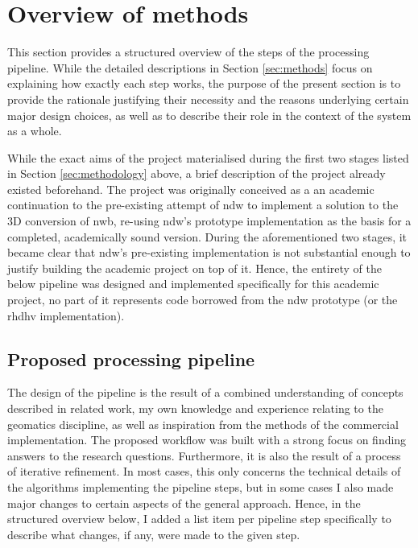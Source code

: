 \section{Overview of methods}
\label{sec:methodsoverview}

This section provides a structured overview of the steps of the processing pipeline. While the detailed descriptions in Section \ref{sec:methods} focus on explaining how exactly each step works, the purpose of the present section is to provide the rationale justifying their necessity and the reasons underlying certain major design choices, as well as to describe their role in the context of the system as a whole.

While the exact aims of the project materialised during the first two stages listed in Section \ref{sec:methodology} above, a brief description of the project already existed beforehand. The project was originally conceived as a an academic continuation to the pre-existing attempt of \ac{ndw} to implement a solution to the 3D conversion of \ac{nwb}, re-using \ac{ndw}'s prototype implementation as the basis for a completed, academically sound version. During the aforementioned two stages, it became clear that \ac{ndw}'s pre-existing implementation is not substantial enough to justify building the academic project on top of it. Hence, the entirety of the below pipeline was designed and implemented specifically for this academic project, no part of it represents code borrowed from the \ac{ndw} prototype (or the \ac{rhdhv} implementation).

\subsection{Proposed processing pipeline}
\label{sub:pipelineoverview}

The design of the pipeline is the result of a combined understanding of concepts described in related work, my own knowledge and experience relating to the geomatics discipline, as well as inspiration from the methods of the commercial implementation. The proposed workflow was built with a strong focus on finding answers to the research questions. Furthermore, it is also the result of a process of iterative refinement. In most cases, this only concerns the technical details of the algorithms implementing the pipeline steps, but in some cases I also made major changes to certain aspects of the general approach. Hence, in the structured overview below, I added a list item per pipeline step specifically to describe what changes, if any, were made to the given step.

